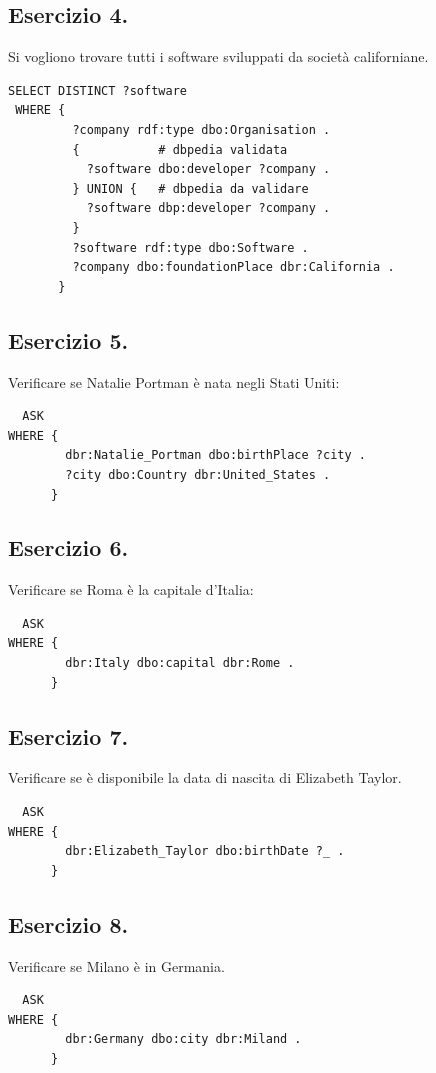 \documentclass[11pt]{article}
\begin{document}
\subsection*{Esercizio 4.}
Si vogliono trovare tutti i software sviluppati da società californiane.
\begin{verbatim}
SELECT DISTINCT ?software
 WHERE {
         ?company rdf:type dbo:Organisation .
         {           # dbpedia validata
           ?software dbo:developer ?company .
         } UNION {   # dbpedia da validare
           ?software dbp:developer ?company .
         }
         ?software rdf:type dbo:Software .
         ?company dbo:foundationPlace dbr:California .
       }
\end{verbatim}

\subsection*{Esercizio 5.}
Verificare se Natalie Portman è nata negli Stati Uniti:
\begin{verbatim}
  ASK
WHERE {
        dbr:Natalie_Portman dbo:birthPlace ?city .
        ?city dbo:Country dbr:United_States .
      }
\end{verbatim}

\subsection*{Esercizio 6.}
Verificare se Roma è la capitale d'Italia:
\begin{verbatim}
  ASK 
WHERE {
        dbr:Italy dbo:capital dbr:Rome .
      }
\end{verbatim}

\subsection*{Esercizio 7.}
Verificare se è disponibile la data di nascita di Elizabeth Taylor.
\begin{verbatim}
  ASK
WHERE {
        dbr:Elizabeth_Taylor dbo:birthDate ?_ .
      }
\end{verbatim}

\subsection*{Esercizio 8.}
Verificare se Milano è in Germania.
\begin{verbatim}
  ASK
WHERE {
        dbr:Germany dbo:city dbr:Miland .
      }
\end{verbatim}
\end{document}
